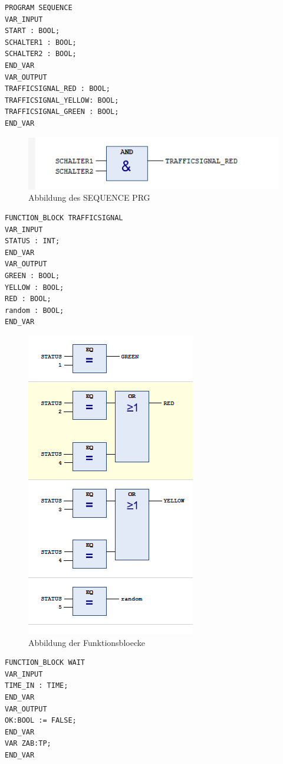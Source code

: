 \begin{lstlisting}[style=Java, caption=SEQUENCE PRG]
PROGRAM SEQUENCE
VAR_INPUT
START : BOOL;
SCHALTER1 : BOOL;
SCHALTER2 : BOOL;
END_VAR
VAR_OUTPUT
TRAFFICSIGNAL_RED : BOOL;
TRAFFICSIGNAL_YELLOW: BOOL;
TRAFFICSIGNAL_GREEN : BOOL;
END_VAR
\end{lstlisting}

\begin{figure}[!h]
	\begin{center}
		\includegraphics[width=0.8\linewidth]{images/sequence}
		\caption{Abbildung des SEQUENCE PRG}
		\label{aufbauprojekt}
	\end{center}
\end{figure}

\begin{lstlisting}[style=Java, caption=TRAFFICSIGNAL FB]
FUNCTION_BLOCK TRAFFICSIGNAL
VAR_INPUT
STATUS : INT;
END_VAR
VAR_OUTPUT
GREEN : BOOL;
YELLOW : BOOL;
RED : BOOL;
random : BOOL;
END_VAR
\end{lstlisting}

\begin{figure}[!h]
	\begin{center}
		\includegraphics[width=0.4\linewidth]{images/fb}
		\caption{Abbildung der Funktionsbloecke}
		\label{aufbauprojekt}
	\end{center}
\end{figure}

\newpage


\begin{lstlisting}[style=Java, caption=TRAFFICSIGNAL FB]
FUNCTION_BLOCK WAIT
VAR_INPUT
TIME_IN : TIME;
END_VAR
VAR_OUTPUT
OK:BOOL := FALSE;
END_VAR
VAR ZAB:TP;
END_VAR
\end{lstlisting}

